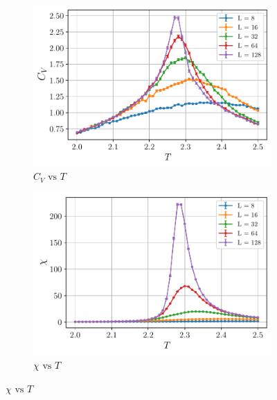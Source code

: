 \documentclass[../journal_main.tex]{subfiles}
\begin{document}
\begin{figure}[!htb]\ContinuedFloat
    \centering
    \begin{subfigure}[b]{0.49\textwidth}
        \centering
        \includegraphics[width=\textwidth]{images/monte_carlo/wolff_cluster/C_v.pdf}
        \caption{$C_V \text{ vs } T$}
        \label{specificheat}
    \end{subfigure}
    \begin{subfigure}[b]{0.49\textwidth}
        \centering
        \includegraphics[width=\textwidth]{images/monte_carlo/wolff_cluster/chi.pdf}
        \caption{$\chi \text{ vs } T$}
        \label{susceptibility}
    \end{subfigure}
\end{figure}
\end{document}

